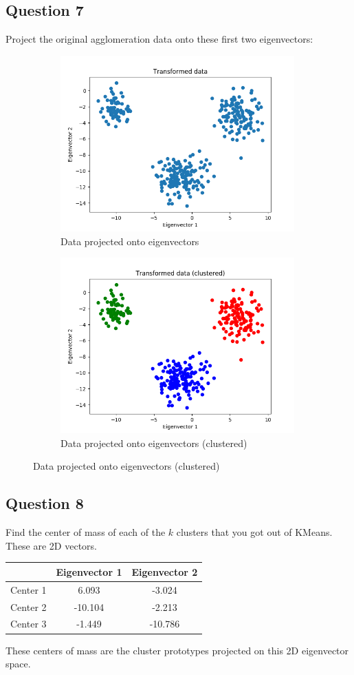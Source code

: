 \documentclass{math}
\begin{document}
\subsection*{Question 7}
Project the original agglomeration data onto these first two eigenvectors:
\begin{figure}[H]
  \begin{subfigure}{0.5\linewidth}
    \centering
    \includegraphics[width=9cm]{assets/hw_08_projected_data.png}
    \caption{Data projected onto eigenvectors}
  \end{subfigure}
  \begin{subfigure}{0.5\linewidth}
    \centering
    \includegraphics[width=9cm]{assets/hw_08_projected_data_clustered.png}
    \caption{Data projected onto eigenvectors (clustered)}
  \end{subfigure}
\end{figure}

\subsection*{Question 8}
Find the center of mass of each of the \( k \) clusters that you got out of
KMeans. These are 2D vectors.
\begin{center}
  \begin{tabular}{|c|c|c|}
    \hline
    & Eigenvector 1 & Eigenvector 2 \\
    \hline
    Center 1 & 6.093 & -3.024 \\
    Center 2 & -10.104 & -2.213 \\
    Center 3 & -1.449 & -10.786 \\
    \hline
  \end{tabular}
\end{center}
These centers of mass are the cluster prototypes projected on this 2D
eigenvector space.
\end{document}
